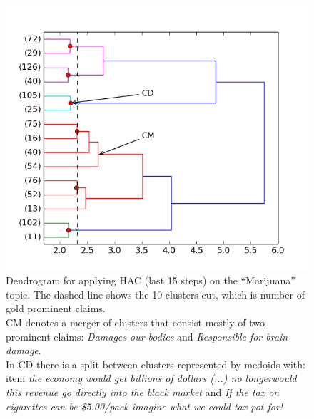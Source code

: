\begin{figure}
\begin{center}
\includegraphics{dendrogram.png}
\end{center}
\caption{Dendrogram for applying HAC (last 15 steps) on the ``Marijuana'' topic.
The dashed line shows the 10-clusters cut, which is number of gold prominent
claims. \\
CM denotes a merger of clusters that consist mostly of two prominent claims: 
\textit{Damages our bodies} and \textit{Responsible for brain damage}.  \\
In CD there is a split between clusters represented by medoids with: 
item \textit{the economy would get billions of dollars (...) no longerwould this revenue
go directly into the black market} and 
\textit{If the tax on cigarettes can
be \$5.00/pack imagine what we could tax pot for!}
}
\label{fig:dendrogram}
\end{figure}

